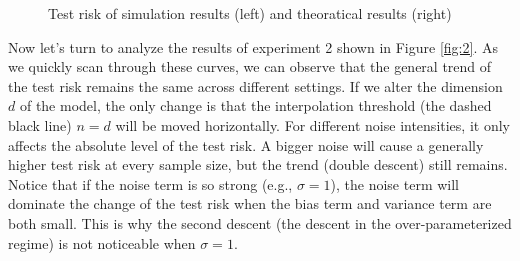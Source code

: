 \documentclass{article}
\begin{document}
\vspace{-5mm}
\begin{figure}[H]
	\centering
	\qquad
	\hspace{-8mm}
	\caption{Test risk of simulation results (left) and theoratical results (right)}
	\label{fig:1}
\end{figure}

\vspace{-5mm}
Now let's turn to analyze the results of experiment 2 shown in Figure \ref{fig:2}. As we quickly scan through these curves, we can observe that the general trend of the test risk remains the same across different settings. If we alter the dimension $d$ of the model, the only change is that the interpolation threshold (the dashed black line) $n = d$ will be moved horizontally. For different noise intensities, it only affects the absolute level of the test risk. A bigger noise will cause a generally higher test risk at every sample size, but the trend (double descent) still remains. Notice that if the noise term is so strong (e.g., $\sigma = 1$), the noise term will dominate the change of the test risk when the bias term and variance term are both small. This is why the second descent (the descent in the over-parameterized regime) is not noticeable when $\sigma = 1$.
\end{document}
